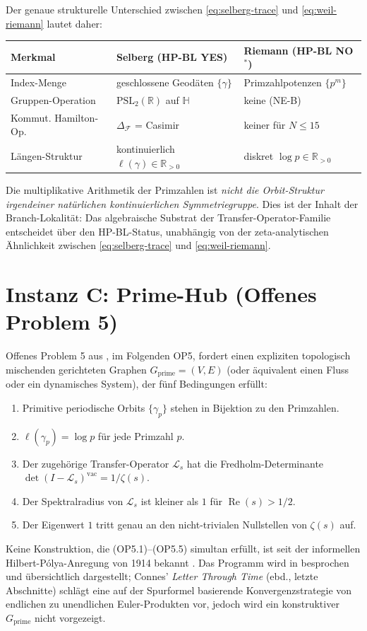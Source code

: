 \documentclass[11pt]{article}
\theoremstyle{definition}
\theoremstyle{remark}
\newcommand{\PSL}{\mathrm{PSL}}
\renewcommand{\Re}{\operatorname{Re}}
\begin{document}
Der genaue strukturelle Unterschied zwischen \eqref{eq:selberg-trace} und
\eqref{eq:weil-riemann} lautet daher:
\begin{center}
\begin{tabular}{@{}lll@{}}
\toprule
Merkmal & Selberg (HP-BL YES) & Riemann (HP-BL NO${}^*$) \\
\midrule
Index-Menge & geschlossene Geodäten $\{\gamma\}$ &
  Primzahlpotenzen $\{p^m\}$ \\
Gruppen-Operation & $\PSL_2(\mathbb{R})$ auf $\mathbb{H}$ & keine (NE-B) \\
Kommut. Hamilton-Op. & $\Delta_\mathcal{F}$ = Casimir & keiner für $N \leq 15$ \\
Längen-Struktur & kontinuierlich $\ell(\gamma) \in \mathbb{R}_{>0}$ &
  diskret $\log p \in \mathbb{R}_{>0}$ \\
\bottomrule
\end{tabular}
\end{center}
Die multiplikative Arithmetik der Primzahlen ist \emph{nicht die Orbit-Struktur
irgendeiner natürlichen kontinuierlichen Symmetriegruppe}. Dies ist der
Inhalt der Branch-Lokalität: Das algebraische Substrat der
Transfer-Operator-Familie entscheidet über den HP-BL-Status, unabhängig
von der zeta-analytischen Ähnlichkeit zwischen \eqref{eq:selberg-trace}
und \eqref{eq:weil-riemann}.

\section{Instanz C: Prime-Hub (Offenes Problem 5)}
\label{sec:primehub}

Offenes Problem 5 aus \cite{Geiger2026RHIII}, im Folgenden OP5, fordert einen
expliziten topologisch mischenden gerichteten Graphen
$G_\mathrm{prime} = (V, E)$ (oder äquivalent einen Fluss oder ein dynamisches System),
der fünf Bedingungen erfüllt:
\begin{enumerate}
\item[(OP5.1)] Primitive periodische Orbits $\{\gamma_p\}$ stehen in
  Bijektion zu den Primzahlen.
\item[(OP5.2)] $\ell(\gamma_p) = \log p$ für jede Primzahl $p$.
\item[(OP5.3)] Der zugehörige Transfer-Operator $\mathcal{L}_s$ hat
  die Fredholm-Determinante $\det(I - \mathcal{L}_s)^{\mathrm{vac}} =
  1/\zeta(s)$.
\item[(OP5.4)] Der Spektralradius von $\mathcal{L}_s$ ist kleiner als $1$
  für $\Re(s) > 1/2$.
\item[(OP5.5)] Der Eigenwert $1$ tritt genau an den nicht-trivialen Nullstellen
  von $\zeta(s)$ auf.
\end{enumerate}
Keine Konstruktion, die (OP5.1)--(OP5.5) simultan erfüllt, ist
seit der informellen Hilbert-P\'olya-Anregung von 1914 bekannt
\cite{Polya1982letter}. Das Programm wird in \cite{Connes2026}
besprochen und übersichtlich dargestellt; Connes' \emph{Letter Through Time}
(ebd., letzte Abschnitte) schlägt eine auf der Spurformel basierende
Konvergenzstrategie von endlichen zu unendlichen Euler-Produkten vor, jedoch wird ein konstruktiver
$G_\mathrm{prime}$ nicht vorgezeigt.
\end{document}
